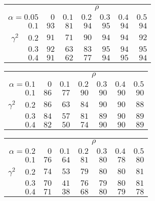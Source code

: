 \begin{tabular}{r|rrrrrr}
\hline\hline
 &\multicolumn{6}{c}{$\rho$} \\ 
 $\alpha = 0.05$ & $0$ & $0.1$ & $0.2$ & $0.3$ & $0.4$ & $0.5$ \\ 
 \hline$0.1$ & $93$ & $81$ & $94$ & $95$ & $94$ & $94$\\ 
$\gamma^2\;\;\;$ $0.2$ & $91$ & $71$ & $90$ & $94$ & $94$ & $92$\\ 
$0.3$ & $92$ & $63$ & $83$ & $95$ & $94$ & $95$\\ 
$0.4$ & $91$ & $62$ & $77$ & $94$ & $95$ & $94$\\ 
 \hline 
 \end{tabular}
 
 \vspace{2em} 
 
\begin{tabular}{r|rrrrrr}
\hline\hline
 &\multicolumn{6}{c}{$\rho$} \\ 
 $\alpha = 0.1$ & $0$ & $0.1$ & $0.2$ & $0.3$ & $0.4$ & $0.5$ \\ 
 \hline$0.1$ & $86$ & $77$ & $90$ & $90$ & $90$ & $90$\\ 
$\gamma^2\;\;\;$ $0.2$ & $86$ & $63$ & $84$ & $90$ & $90$ & $88$\\ 
$0.3$ & $84$ & $57$ & $81$ & $89$ & $90$ & $89$\\ 
$0.4$ & $82$ & $50$ & $74$ & $90$ & $90$ & $89$\\ 
 \hline 
 \end{tabular}
 
 \vspace{2em} 
 
\begin{tabular}{r|rrrrrr}
\hline\hline
 &\multicolumn{6}{c}{$\rho$} \\ 
 $\alpha = 0.2$ & $0$ & $0.1$ & $0.2$ & $0.3$ & $0.4$ & $0.5$ \\ 
 \hline$0.1$ & $76$ & $64$ & $81$ & $80$ & $78$ & $80$\\ 
$\gamma^2\;\;\;$ $0.2$ & $74$ & $53$ & $79$ & $80$ & $80$ & $81$\\ 
$0.3$ & $70$ & $41$ & $76$ & $79$ & $80$ & $81$\\ 
$0.4$ & $71$ & $38$ & $68$ & $80$ & $79$ & $78$\\ 
 \hline 
 \end{tabular}